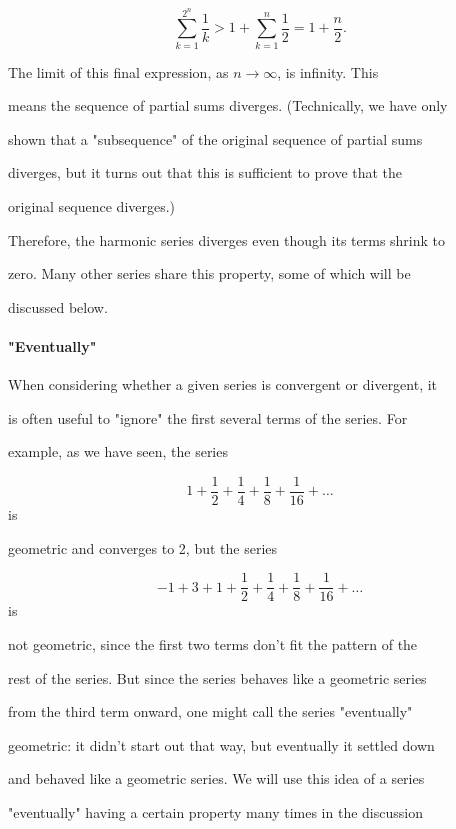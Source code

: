 $$\sum _{k=1}^{2^n} \frac{1}{k} > 1+\sum _{k=1}^{n} \frac{1}{2}=1+\frac{n}{2}.$$

The limit of this final expression, as $n\to\infty$, is infinity. This

means the sequence of partial sums diverges. (Technically, we have only

shown that a "subsequence" of the original sequence of partial sums

diverges, but it turns out that this is sufficient to prove that the

original sequence diverges.)



Therefore, the harmonic series diverges even though its terms shrink to

zero. Many other series share this property, some of which will be

discussed below.



\paragraph{"Eventually"}



When considering whether a given series is convergent or divergent, it

is often useful to "ignore" the first several terms of the series. For

example, as we have seen, the series



$$1+\frac{1}{2}+\frac{1}{4}+\frac{1}{8}+\frac{1}{16}+\ldots$$ is

geometric and converges to 2, but the series



$$-1+3+1+\frac{1}{2}+\frac{1}{4}+\frac{1}{8}+\frac{1}{16}+\ldots$$ is

not geometric, since the first two terms don't fit the pattern of the

rest of the series. But since the series behaves like a geometric series

from the third term onward, one might call the series "eventually"

geometric: it didn't start out that way, but eventually it settled down

and behaved like a geometric series. We will use this idea of a series

"eventually" having a certain property many times in the discussion

